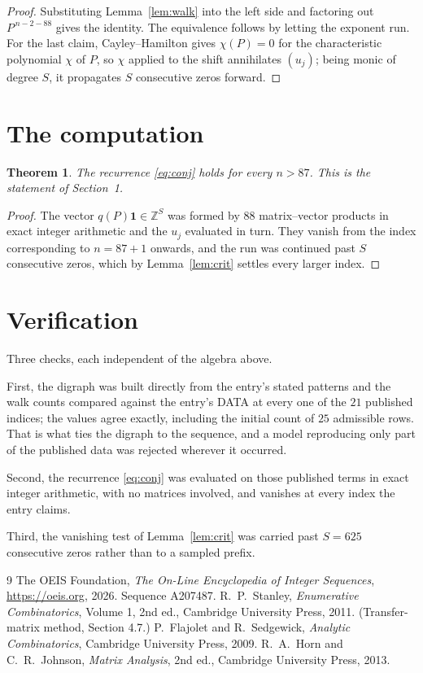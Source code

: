 \documentclass[11pt,a4paper]{article}
\theoremstyle{plain}
\newtheorem{theorem}{Theorem}
\theoremstyle{definition}
\begin{document}
\begin{proof}
Substituting Lemma~\ref{lem:walk} into the left side and factoring out
$P^{\,n-2-88}$ gives the identity. The equivalence follows by letting the exponent
run. For the last claim, Cayley--Hamilton gives $\chi(P)=0$ for the characteristic
polynomial $\chi$ of $P$, so $\chi$ applied to the shift annihilates $(u_j)$; being monic of
degree $S$, it propagates $S$ consecutive zeros forward.
\end{proof}

\section{The computation}

\begin{theorem}
The recurrence \eqref{eq:conj} holds for every $n>87$. This is the statement of
Section~1.
\end{theorem}

\begin{proof}
The vector $q(P)\mathbf{1}\in\mathbb{Z}^{S}$ was formed by $88$ matrix--vector
products in exact integer arithmetic and the $u_j$ evaluated in turn. They vanish from the
index corresponding to $n=87+1$ onwards, and the run was continued past $S$ consecutive
zeros, which by Lemma~\ref{lem:crit} settles every larger index.
\end{proof}

\section{Verification}

Three checks, each independent of the algebra above.

First, the digraph was built directly from the entry's stated patterns and the walk counts
compared against the entry's DATA at every one of the $21$ published indices; the
values agree exactly, including the initial count of $25$ admissible rows. That is
what ties the digraph to the sequence, and a model reproducing only part of the published
data was rejected wherever it occurred.

Second, the recurrence \eqref{eq:conj} was evaluated on those published terms in exact
integer arithmetic, with no matrices involved, and vanishes at every index the entry claims.

Third, the vanishing test of Lemma~\ref{lem:crit} was carried past $S=625$ consecutive
zeros rather than to a sampled prefix.

\begin{thebibliography}{9}
 The OEIS Foundation, \emph{The On-Line Encyclopedia of Integer
Sequences}, \url{https://oeis.org}, 2026. Sequence A207487.
 R.~P.~Stanley, \emph{Enumerative Combinatorics}, Volume 1, 2nd ed.,
Cambridge University Press, 2011. (Transfer-matrix method, Section 4.7.)
 P.~Flajolet and R.~Sedgewick, \emph{Analytic Combinatorics}, Cambridge
University Press, 2009.
 R.~A.~Horn and C.~R.~Johnson, \emph{Matrix Analysis}, 2nd ed., Cambridge
University Press, 2013.
\end{thebibliography}
\end{document}
